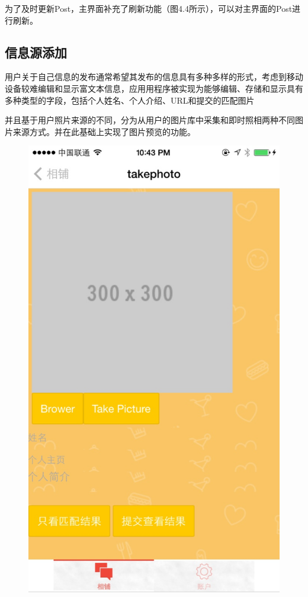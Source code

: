 为了及时更新Post，主界面补充了刷新功能（图4.4所示），可以对主界面的Post进行刷新。

\subsection{信息源添加}
用户关于自己信息的发布通常希望其发布的信息具有多种多样的形式，考虑到移动设备较难编辑和显⽰富⽂本信息，应⽤用程序被实现为能够编辑、存储和显示具有多种类型的字段，包括个人姓名、个人介绍、URL和提交的匹配图片

并且基于用户照片来源的不同，分为从用户的图片库中采集和即时照相两种不同图片来源方式。并在此基础上实现了图片预览的功能。
\begin{figure}[h] 
\begin{minipage}[t]{0.3\linewidth}
\centering
\includegraphics[width=\textwidth]{img/chap4/take1.jpg}

\end{minipage}
\end{figure}
